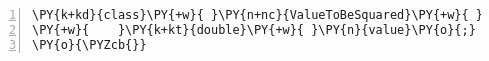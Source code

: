 \begin{Verbatim}[commandchars=\\\{\},numbers=left,firstnumber=1,stepnumber=1,frame=single,fontsize=\small]
\PY{k+kd}{class}\PY{+w}{ }\PY{n+nc}{ValueToBeSquared}\PY{+w}{ }\PY{k+kd}{implements}\PY{+w}{ }\PY{n}{Input}\PY{+w}{ }\PY{o}{\PYZob{}}
\PY{+w}{    }\PY{k+kt}{double}\PY{+w}{ }\PY{n}{value}\PY{o}{;}
\PY{o}{\PYZcb{}}
\end{Verbatim}
